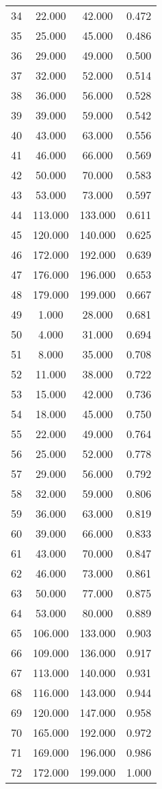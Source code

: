 \begin{tabular}{cccc}
  34 & 22.000 & 42.000 & 0.472 \\ 
  35 & 25.000 & 45.000 & 0.486 \\ 
  36 & 29.000 & 49.000 & 0.500 \\ 
  37 & 32.000 & 52.000 & 0.514 \\ 
  38 & 36.000 & 56.000 & 0.528 \\ 
  39 & 39.000 & 59.000 & 0.542 \\ 
  40 & 43.000 & 63.000 & 0.556 \\ 
  41 & 46.000 & 66.000 & 0.569 \\ 
  42 & 50.000 & 70.000 & 0.583 \\ 
  43 & 53.000 & 73.000 & 0.597 \\ 
  44 & 113.000 & 133.000 & 0.611 \\ 
  45 & 120.000 & 140.000 & 0.625 \\ 
  46 & 172.000 & 192.000 & 0.639 \\ 
  47 & 176.000 & 196.000 & 0.653 \\ 
  48 & 179.000 & 199.000 & 0.667 \\ 
  49 & 1.000 & 28.000 & 0.681 \\ 
  50 & 4.000 & 31.000 & 0.694 \\ 
  51 & 8.000 & 35.000 & 0.708 \\ 
  52 & 11.000 & 38.000 & 0.722 \\ 
  53 & 15.000 & 42.000 & 0.736 \\ 
  54 & 18.000 & 45.000 & 0.750 \\ 
  55 & 22.000 & 49.000 & 0.764 \\ 
  56 & 25.000 & 52.000 & 0.778 \\ 
  57 & 29.000 & 56.000 & 0.792 \\ 
  58 & 32.000 & 59.000 & 0.806 \\ 
  59 & 36.000 & 63.000 & 0.819 \\ 
  60 & 39.000 & 66.000 & 0.833 \\ 
  61 & 43.000 & 70.000 & 0.847 \\ 
  62 & 46.000 & 73.000 & 0.861 \\ 
  63 & 50.000 & 77.000 & 0.875 \\ 
  64 & 53.000 & 80.000 & 0.889 \\ 
  65 & 106.000 & 133.000 & 0.903 \\ 
  66 & 109.000 & 136.000 & 0.917 \\ 
  67 & 113.000 & 140.000 & 0.931 \\ 
  68 & 116.000 & 143.000 & 0.944 \\ 
  69 & 120.000 & 147.000 & 0.958 \\ 
  70 & 165.000 & 192.000 & 0.972 \\ 
  71 & 169.000 & 196.000 & 0.986 \\ 
  72 & 172.000 & 199.000 & 1.000 \\ 
   \hline
\end{tabular}
